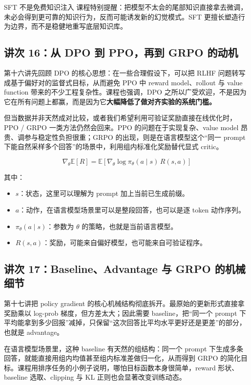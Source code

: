 \documentclass[a4paper]{article}
\begin{document}
\begin{warningbox}{SFT 不是免费知识注入}
课程特别提醒：把模型不太会的尾部知识直接拿去微调，未必会得到更可靠的知识行为，反而可能诱发新的幻觉模式。SFT 更擅长塑造行为边界，而不是稳健地重写底层知识库。
\end{warningbox}

\subsection{讲次 16：从 DPO 到 PPO，再到 GRPO 的动机}
第十六讲先回顾 DPO 的核心思想：在一些合理假设下，可以把 RLHF 问题转写成基于偏好对的监督式目标，从而避免 PPO 中 reward model、rollout 与 value function 带来的不少工程复杂性。课程也强调，DPO 之所以广受欢迎，不是因为它在所有问题上都赢，而是因为它\textbf{大幅降低了做对齐实验的系统门槛。}

但当数据并非天然成对比较，或者我们希望利用可验证奖励直接在线优化时，PPO / GRPO 一类方法仍然会回来。PPO 的问题在于实现复杂、value model 昂贵、调参与稳定性负担很重；GRPO 的出现，则是在语言模型这个“同一 prompt 下能自然采样多个回答”的场景中，利用组内标准化奖励替代显式 critic。

\[
\nabla_{\theta} \mathbb{E}[R] = \mathbb{E}\left[\nabla_{\theta}\log \pi_{\theta}(a \mid s)\, R(s,a)\right]
\]

其中：
\begin{itemize}
\item $s$：状态，这里可以理解为 prompt 加上当前已生成前缀。
\item $a$：动作，在语言模型场景里可以是整段回答，也可以是逐 token 动作序列。
\item $\pi_{\theta}(a \mid s)$：参数为 $\theta$ 的策略，也就是当前语言模型。
\item $R(s,a)$：奖励，可能来自偏好模型，也可能来自可验证程序。
\end{itemize}

\subsection{讲次 17：Baseline、Advantage 与 GRPO 的机械细节}
第十七讲把 policy gradient 的核心机械结构彻底拆开。最原始的更新形式直接拿奖励乘以 log-prob 梯度，但方差太大；因此需要 baseline，把“同一个 prompt 下平均能拿到多少回报”减掉，只保留“这次回答比平均水平更好还是更差”的部分，也就是 advantage。

在语言模型场景里，这种 baseline 有天然的组结构：同一个 prompt 下生成多条回答，就能直接用组内均值甚至组内标准差做归一化，从而得到 GRPO 的简化目标。课程用排序任务的小例子说明，哪怕目标函数本身很简单，reward 形状、baseline 选取、clipping 与 KL 正则也会显著改变训练动态。
\end{document}

